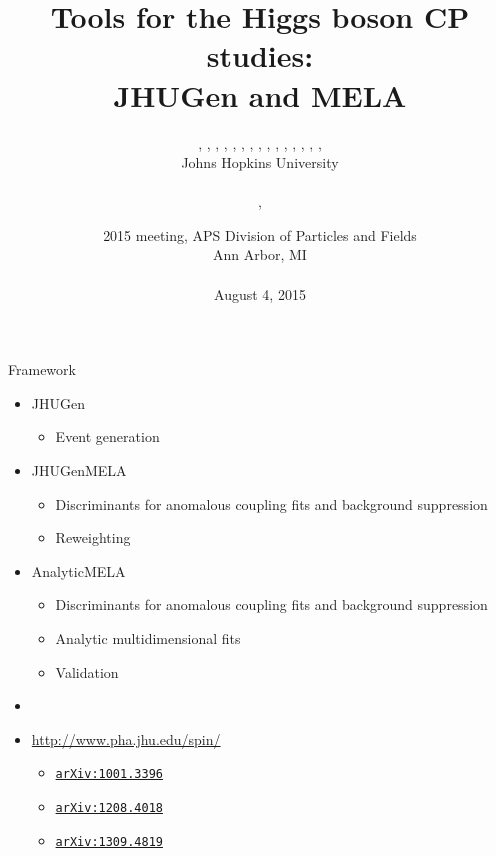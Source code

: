 \documentclass[usenames,dvipsnames,svgnames,table]{beamer}
\title[JHUGen and MELA]{Tools for the Higgs boson CP studies: \\ JHUGen and MELA}
\author[Heshy Roskes]{\CMS{I.~Anderson}, \CMS{S.~Bolognesi}, \theory{F.~Caola}, \ATLAS{Y.~Gao}, \CMS{A.~Gritsan}, \CMS{Z.~Guo}, \CMS{C.~Martin}, \theory{K.~Melnikov}, \me{Heshy~Roskes}, \CMS{U.~Sarica}, \theory{M.~Schulze}, \CMS{N.~Tran}, \CMS{A.~Whitbeck}, \CMS{M.~Xiao}, \CMS{C.~You}, \theory{Y.~Zhou}
\texorpdfstring{
\\Johns Hopkins University\\ \leavevmode \\
\theory{Theory}, \experiment{experiment}}{}}
\date[August 4, 2015]{2015 meeting, APS Division of Particles and Fields\\
Ann Arbor, MI \\ \leavevmode \\
August 4, 2015}
\newcommand{\arxiv}[1]{\href{http://arxiv.org/abs/#1}{\nolinkurl{arXiv:#1}}}
\newcommand{\snowmass}{\arxiv{1309.4819}}
\begin{document}
\begin{frame}
\titlepage
\end{frame}

\begin{frame}{Framework}

\begin{itemize}
\small
\item JHUGen
\begin{itemize}
\item Event generation
\end{itemize}
\item JHUGenMELA
\begin{itemize}
\item Discriminants for anomalous coupling fits and background suppression
\item Reweighting
\end{itemize}
\item AnalyticMELA
\begin{itemize}
\item Discriminants for anomalous coupling fits and background suppression
\item Analytic multidimensional fits
\item Validation
\end{itemize}
\item
\item \url{http://www.pha.jhu.edu/spin/}
\begin{itemize}
\item \arxiv{1001.3396}
\item \arxiv{1208.4018}
\item \snowmass
\end{itemize}
\end{itemize}

\end{frame}
\end{document}
